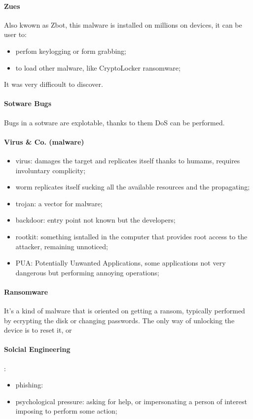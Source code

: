 \documentclass[12pt]{article}
\begin{document}
\paragraph{Zues}
Also kwown as Zbot, this malware is installed on millions on devices, it can be user to:
\begin{itemize}
    \item perfom keylogging or form grabbing;
    \item to load other malware, like CryptoLocker ransomware;
\end{itemize}
It was very difficoult to discover.

\paragraph{Sotware Bugs}
Bugs in a sotware are explotable, thanks to them DoS can be performed.

\paragraph{Virus \& Co. (malware)}
\begin{itemize}
    \item virus: damages the target and replicates itself thanks to humams, requires involuntary complicity;
    \item worm replicates itself sucking all the available resources and the propagating;
    \item trojan: a vector for malware;
    \item backdoor: entry point not known but the developers;
    \item rootkit: something isntalled in the computer that provides root access to the attacker, remaining unnoticed;
    \item PUA: Potentially Unwanted Applications, some applications not very dangerous but performing annoying operations;
\end{itemize}


\paragraph{Ransomware}
It's a kind of malware that is oriented on getting a ransom, typically performed by ecrypting the disk or changing passwords. The only way of unlocking the device is to reset it, or 


\paragraph{Solcial Engineering}:
\begin{itemize}
    \item phishing:
    \item psychological pressure: asking for help, or impersonating a person of interest imposing to perform some action;
\end{itemize}
\end{document}
